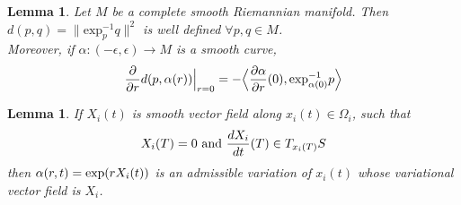 \documentclass[letterpaper, 10 pt, conference]{ieeeconf}  %
\newtheorem{lemma}[definition]{Lemma}
\begin{document}
%
%
\begin{lemma}
%
Let $M$ be a complete smooth Riemannian manifold. Then $ d(p, q) = \| \mbox{exp}^{-1}_{p}q \|^2$ is well defined $\forall p, q \in M$.  \\
Moreover, if $\alpha : (-\epsilon, \epsilon) \rightarrow M$ is a smooth curve,
\begin{equation*}
\frac{\partial}{\partial r}d(p, \alpha(r))\Big{|}_{r=0} = -\Big{\langle} {\frac{\partial \alpha}{\partial r}}(0), \mbox{exp}^{-1}_{\alpha(0)}{p}\Big{\rangle}
\end{equation*}
%
\label{exp_map_lemma}
\end{lemma}
%
\begin{lemma}
%
If $X_i(t)$ is smooth vector field along $x_i(t) \in \Omega_i$, such that
\begin{equation*}
X_i(T) = 0 \hbox{ and } \frac{dX_i}{dt}(T) \in T_{x_i(T)}S
\end{equation*}
then $\alpha(r,t) = \hbox{exp}(rX_i(t))$ is an admissible variation of $x_i(t)$ whose variational vector field is $X_i$.
%
\label{var_vecfield_lemma}
%
\end{lemma}
%
\end{document}
